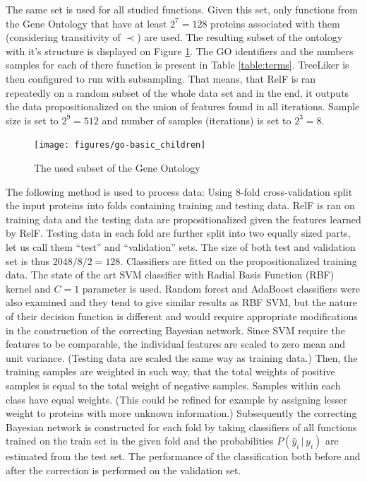 \documentclass[11pt,twoside,a4paper]{book}
\begin{document}
The same set is used for all studied functions.
Given this set, only functions from the Gene Ontology that have at least $2^7 = 128$
proteins associated with them (considering transitivity of $\prec$) are used.
The resulting subset of the ontology with it's structure is displayed on Figure \ref{fig:go}.
The GO identifiers and the numbers samples for each of there function is present in Table \ref{table:terms}.  
TreeLiker is then configured to run with subsampling.
That means, that RelF is ran repeatedly on a random subset of the whole data set
and in the end, it outputs the data propositionalized on the
union of features found in all iterations.
Sample size is set to $2^9=512$ and number of samples (iterations) is set to $2^3=8$.

\begin{landscape}
\begin{figure}[h]
\begin{center}
\texttt{[image: figures/go-basic\_children]}
\caption{The used subset of the Gene Ontology}
\label{fig:go}
\end{center}
\end{figure}
\end{landscape}

The following method is used to process data:
Using 8-fold cross-validation split the input proteins into folds
containing training and testing data.
RelF is ran on training data and the testing 
data are propositionalized given the features learned by RelF.
Testing data in each fold are further split into two equally sized parts,
let us call them ``test'' and ``validation'' sets.
The size of both test and validation set is thus $2048 / 8 / 2 =  128$.
Classifiers are fitted on the propositionalized training data.
The state of the art SVM classifier with Radial Basis Function (RBF)
kernel and $C = 1$ parameter is used.
Random forest and AdaBoost classifiers were also examined 
and they tend to give similar results as RBF SVM,
but the nature of their decision function is different
and would require appropriate modifications in the construction of the 
correcting Bayesian network.
Since SVM require the features to be comparable,
the individual features are scaled to zero mean and unit variance.
(Testing data are scaled the same way as training data.)
Then, the training samples are weighted in such way, that the total weights
of positive samples is equal to the total weight of negative samples.
Samples within each class have equal weights. 
(This could be refined for example by assigning lesser weight
to proteins with more unknown information.)
Subsequently the correcting Bayesian network is constructed
for each fold by taking classifiers of all functions trained
on the train set in the given fold
and the probabilities $P(\hat{y}_i\,|\,y_i)$ are estimated from the test set.
The performance of the classification both before and after the correction
is performed on the validation set.
\end{document}
